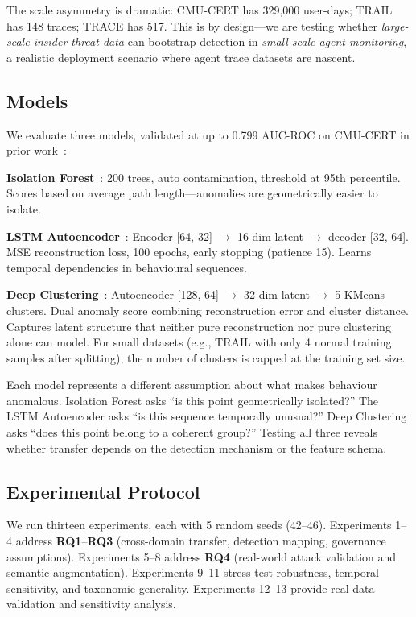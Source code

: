 \documentclass[conference]{IEEEtran}
\newcommand{\RQ}[1]{\textbf{RQ#1}}
\begin{document}
The scale asymmetry is dramatic: CMU-CERT has 329,000 user-days; TRAIL has 148 traces; TRACE has 517. This is by design---we are testing whether \textit{large-scale insider threat data} can bootstrap detection in \textit{small-scale agent monitoring}, a realistic deployment scenario where agent trace datasets are nascent.

\subsection{Models}
\label{sec:models}

We evaluate three models, validated at up to 0.799 AUC-ROC on CMU-CERT in prior work~\cite{rimal2026insider}:

\textbf{Isolation Forest}~\cite{liu2008isolation}: 200 trees, auto contamination, threshold at 95th percentile. Scores based on average path length---anomalies are geometrically easier to isolate.

\textbf{LSTM Autoencoder}~\cite{malhotra2016lstm, hochreiter1997lstm}: Encoder [64, 32] $\to$ 16-dim latent $\to$ decoder [32, 64]. MSE reconstruction loss, 100 epochs, early stopping (patience 15). Learns temporal dependencies in behavioural sequences.

\textbf{Deep Clustering}~\cite{xie2024deep}: Autoencoder [128, 64] $\to$ 32-dim latent $\to$ 5 KMeans clusters. Dual anomaly score combining reconstruction error and cluster distance. Captures latent structure that neither pure reconstruction nor pure clustering alone can model. For small datasets (e.g., TRAIL with only 4 normal training samples after splitting), the number of clusters is capped at the training set size.

Each model represents a different assumption about what makes behaviour anomalous. Isolation Forest asks ``is this point geometrically isolated?'' The LSTM Autoencoder asks ``is this sequence temporally unusual?'' Deep Clustering asks ``does this point belong to a coherent group?'' Testing all three reveals whether transfer depends on the detection mechanism or the feature schema.

\subsection{Experimental Protocol}
\label{sec:protocol}

We run thirteen experiments, each with 5 random seeds (42--46). Experiments 1--4 address \RQ{1}--\RQ{3} (cross-domain transfer, detection mapping, governance assumptions). Experiments 5--8 address \RQ{4} (real-world attack validation and semantic augmentation). Experiments 9--11 stress-test robustness, temporal sensitivity, and taxonomic generality. Experiments 12--13 provide real-data validation and sensitivity analysis.
\end{document}
